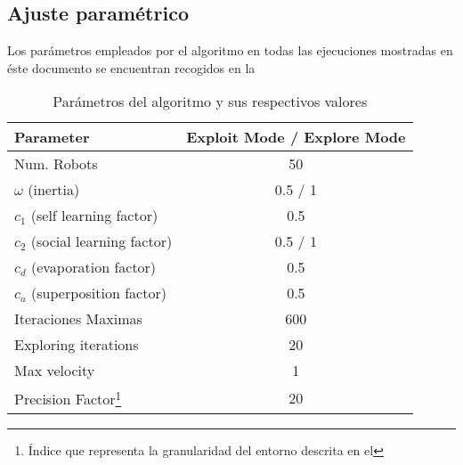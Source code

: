\newcommand{\prefacnota}{\footnote{
		Índice que representa la granularidad del entorno descrita en el \refcruzada{Apartado}{sec:espacio}
	}}

\subsection{Ajuste paramétrico}
Los parámetros empleados por el algoritmo en todas las ejecuciones mostradas en éste documento se encuentran recogidos en la 
\begin{savenotes}
	\begin{table}[]
	   	\centering
	    \caption{Parámetros del algoritmo y sus respectivos valores}
		\begin{tabular}{|l|c|}
			\hline
			Parameter                      & Exploit Mode / Explore Mode                      \\ 
			\hline
			Num. Robots                    & 50                                               \\
			$\omega$ (inertia)             & 0.5 / 1                                          \\
			$c_1$ (self learning factor)   & 0.5                                              \\
			$c_2$ (social learning factor) & 0.5 / 1                                          \\
			$c_d$ (evaporation factor)     & 0.5                                              \\
			$c_a$ (superposition factor)   & 0.5                                              \\
			Iteraciones Maximas            & 600                                              \\
			Exploring iterations           & 20                                               \\
			Max velocity                   & 1                                                \\
			Precision Factor\prefacnota    & 20                                               \\ \hline
		\end{tabular}
    	\label{tabla:1}
	\end{table}
\end{savenotes}

